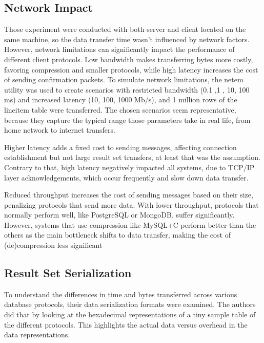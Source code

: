 \documentclass[sigconf]{acmart}
\begin{document}
\subsection{Network Impact}
Those experiment were conducted with both server and client located on the same machine, so the data transfer time wasn't influenced by network factors. However, network limitations can significantly impact the performance of different client protocols. Low bandwidth makes transferring bytes more costly, favoring compression and smaller protocols, while high latency increases the cost of sending confirmation packets.
To simulate network limitations, the netem \cite{hemminger2005netem} utility was used to create scenarios with restricted bandwidth (0.1 ,1 , 10, 100 ms) and increased latency (10, 100, 1000 Mb/s), and 1 million rows of the lineitem table were transferred. The chosen scenarios seem representative, because they capture the typical range those parameters take in real life, from home network to internet transfers.

Higher latency adds a fixed cost to sending messages, affecting connection establishment but not large result set transfers, at least that was the assumption. Contrary to that, high latency negatively impacted all systems, due to TCP/IP layer acknowledgements, which occur frequently and slow down data transfer.

Reduced throughput increases the cost of sending messages based on their size, penalizing protocols that send more data. With lower throughput, protocols that normally perform well, like PostgreSQL or MongoDB, suffer significantly. However, systems that use compression like MySQL+C perform better than the others as the main bottleneck shifts to data transfer, making the cost of (de)compression less significant

\subsection{Result Set Serialization}
To understand the differences in time and bytes transferred across various database protocols, their data serialization formats were examined. The authors did that by looking at the hexadecimal representations of a tiny sample table of the different protocols. This highlights the actual data versus overhead in the data representations.
\end{document}
